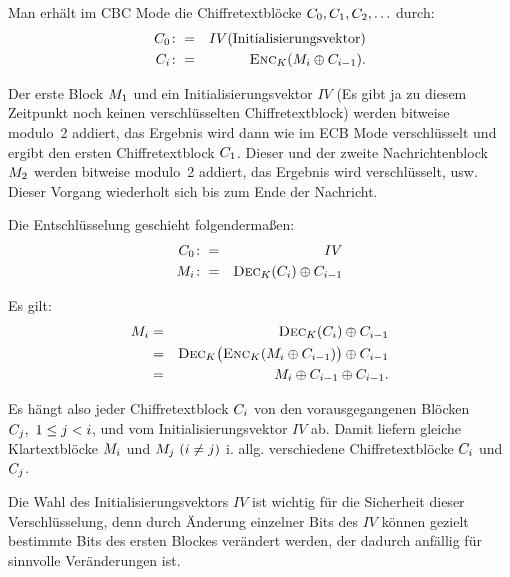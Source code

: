 Man erhält im CBC Mode die Chiffretextblöcke $C_0 ,C_1 ,C_2 ,\ldots$ durch:
\begin{eqnarray*}
  C_0	& \colon=	& IV {\rm (Initialisierungsvektor)} \\
  C_i	& \colon=	& \textsc{Enc}_{K}(M_i \oplus C_{i-1}).
\end{eqnarray*}

Der erste Block $M_1$ und ein Initialisierungsvektor $IV$ (Es gibt ja zu diesem Zeitpunkt noch keinen verschlüsselten Chiffretextblock) werden bitweise
modulo~2 addiert, das Ergebnis wird dann wie im ECB Mode verschlüsselt und ergibt den ersten Chiffretextblock $C_1$. Dieser und der zweite
Nachrichtenblock $M_2$ werden bitweise modulo~2 addiert, das Ergebnis wird verschlüsselt, usw. Dieser Vorgang wiederholt sich bis zum Ende der Nachricht.

Die Entschlüsselung geschieht folgenderma\ss{}en:
\begin{eqnarray*}
  C_0	& \colon=	& IV \\
  M_i	& \colon=	& \textsc{Dec}_{K}(C_i)\oplus C_{i-1}
\end{eqnarray*}

Es gilt:
\begin{eqnarray*}
  M_i	& =	& \textsc{Dec}_{K}(C_i)\oplus C_{i-1} \\
	& =	& \textsc{Dec}_{K} \bigl(\textsc{Enc}_{K}(M_i\oplus C_{i-1})\bigr) \oplus C_{i-1} \\
	& =	& M_i\oplus C_{i-1}\oplus C_{i-1} .
\end{eqnarray*}

Es hängt also jeder Chiffretextblock $C_i$ von den vorausgegangenen Blöcken $C_j,\ 1\leq j<i$, und vom Initialisierungsvektor $IV$ ab. Damit
liefern gleiche Klartextblöcke $M_i$ und $M_j\ (i\neq j)$ i. allg. verschiedene Chiffretextblöcke $C_i$ und $C_j$.

Die Wahl des Initialisierungsvektors $IV$ ist wichtig für die Sicherheit dieser Verschlüsselung, denn durch Änderung einzelner Bits des $IV$ können gezielt
bestimmte Bits des ersten Blockes verändert werden, der dadurch anfällig für sinnvolle Veränderungen ist.

